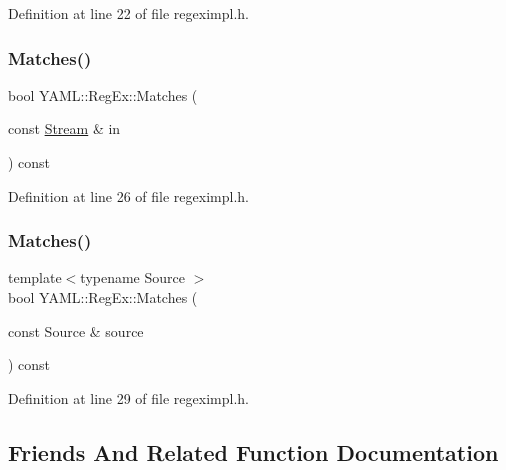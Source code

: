Definition at line 22 of file regeximpl.\+h.

\mbox{\label{class_y_a_m_l_1_1_reg_ex_a30bbe0a734cde6939a8039963fa7bb48}} 
\subsubsection{\texorpdfstring{Matches()}{Matches()}\hspace{0.1cm}{\footnotesize\ttfamily [3/4]}}
{\footnotesize\ttfamily bool Y\+A\+M\+L\+::\+Reg\+Ex\+::\+Matches (\begin{DoxyParamCaption}\item[{const \mbox{\hyperlink{class_y_a_m_l_1_1_stream}{Stream}} \&}]{in }\end{DoxyParamCaption}) const\hspace{0.3cm}{\ttfamily [inline]}}



Definition at line 26 of file regeximpl.\+h.

\mbox{\label{class_y_a_m_l_1_1_reg_ex_a2690a7654d9b0df2affb6f77373d1ddd}} 
\subsubsection{\texorpdfstring{Matches()}{Matches()}\hspace{0.1cm}{\footnotesize\ttfamily [4/4]}}
{\footnotesize\ttfamily template$<$typename Source $>$ \\
bool Y\+A\+M\+L\+::\+Reg\+Ex\+::\+Matches (\begin{DoxyParamCaption}\item[{const Source \&}]{source }\end{DoxyParamCaption}) const\hspace{0.3cm}{\ttfamily [inline]}}



Definition at line 29 of file regeximpl.\+h.



\subsection{Friends And Related Function Documentation}
\mbox{\label{class_y_a_m_l_1_1_reg_ex_a8bea108f9b6252aa9fe7f7f6536511b5}} 
